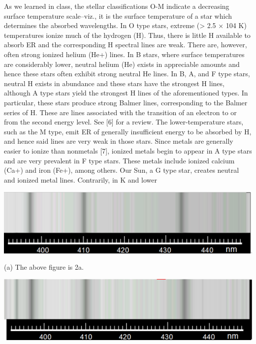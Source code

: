\documentclass[12pt]{article}
\begin{document}
As we learned in class, the stellar classifications O-M indicate a decreasing
surface temperature scale–viz., it is the surface temperature of a star which
determines the absorbed wavelengths. In O type stars, extreme (> 2.5 × 104 K)
temperatures ionize much of the hydrogen (H). Thus, there is little H available to
absorb ER and the corresponding H spectral lines are weak. There are, however,
often strong ionized helium (He+) lines. In B stars, where surface temperatures
are considerably lower, neutral helium (He) exists in appreciable amounts and
hence these stars often exhibit strong neutral He lines. In B, A, and F type
stars, neutral H exists in abundance and these stars have the strongest H lines,
although A type stars yield the strongest H lines of the aforementioned types. In
particular, these stars produce strong Balmer lines, corresponding to the Balmer
series of H. These are lines associated with the transition of an electron to or
from the second energy level. See [6] for a review. The lower-temperature stars,
such as the M type, emit ER of generally insufficient energy to be absorbed by
H, and hence said lines are very weak in those stars.
Since metals are generally easier to ionize than nonmetals [7], ionized metals
begin to appear in A type stars and are very prevalent in F type stars. These
metals include ionized calcium (Ca+) and iron (Fe+), among others. Our Sun, a
G type star, creates neutral and ionized metal lines. Contrarily, in K and lower


\begin{center}
    \includegraphics[scale=0.5]{fig2a}
\end{center}

\centerline{(a) The above figure is 2a.}


\begin{center}
    \includegraphics[scale=0.5]{fig2b}
\end{center}
\end{document}
